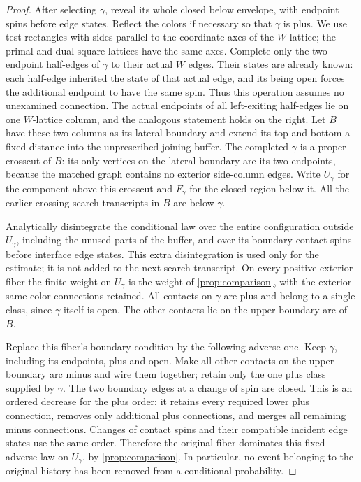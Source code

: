 \begin{proof}
After selecting $\gamma$, reveal its whole closed below envelope,
with endpoint spins before edge states. Reflect the colors if necessary
so that $\gamma$ is plus. We use test rectangles with sides parallel to
the coordinate axes of the $W$ lattice; the primal and dual square
lattices have the same axes. Complete only the two endpoint half-edges
of $\gamma$ to their actual $W$ edges. Their states are already known:
each half-edge inherited the state of that actual edge, and its being
open forces the additional endpoint to have the same spin. Thus this
operation assumes no unexamined connection. The actual endpoints of all
left-exiting half-edges lie on one $W$-lattice column, and the analogous
statement holds on the right. Let $B$ have these two columns as its
lateral boundary and extend its top and bottom a fixed distance into
the unprescribed joining buffer. The completed $\gamma$ is a proper
crosscut of $B$: its only vertices on the lateral boundary are its two
endpoints, because the matched graph contains no exterior side-column
edges. Write $U_\gamma$ for the component above this crosscut and
$F_\gamma$ for the closed region below it. All the earlier crossing-search
transcripts in $B$ are below $\gamma$.

Analytically disintegrate the conditional law over the entire
configuration outside $U_\gamma$, including the unused parts of the
buffer, and over its boundary contact spins before interface edge
states. This extra disintegration is used only for the estimate; it is
not added to the next search transcript. On every positive exterior
fiber the finite weight on $U_\gamma$ is the weight of
\cref{prop:comparison}, with the exterior same-color connections
retained. All contacts on $\gamma$ are plus and belong to a single
class, since $\gamma$ itself is open. The other contacts lie on the
upper boundary arc of $B$.

Replace this fiber's boundary condition by the following adverse one.
Keep $\gamma$, including its endpoints, plus and open. Make all other
contacts on the upper boundary arc minus and wire them together; retain
only the one plus class supplied by $\gamma$. The two boundary edges
at a change of spin are closed. This is an ordered decrease for the
plus order: it retains every required lower plus connection, removes
only additional plus connections, and merges all remaining minus
connections. Changes of contact spins and their compatible incident
edge states use the same order. Therefore the original fiber dominates
this fixed adverse law on $U_\gamma$, by \cref{prop:comparison}.
In particular, no event belonging to the original history has been
removed from a conditional probability.


\end{proof}
